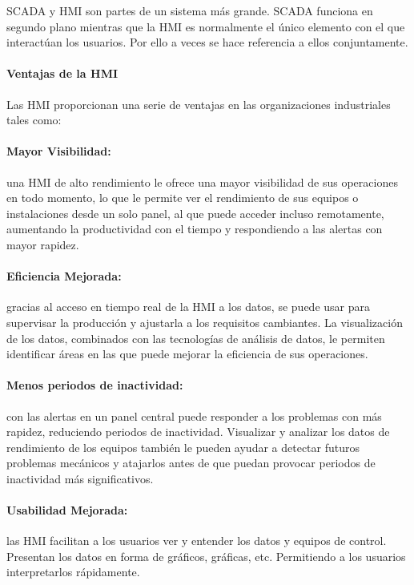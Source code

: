 \documentclass[12pt,titlepage]{article}
\begin{document}
SCADA y HMI son partes de un sistema más grande. SCADA funciona en segundo plano mientras que la HMI es normalmente el único elemento con el que interactúan los usuarios. Por ello a veces se hace referencia a ellos conjuntamente. \\  

\paragraph{Ventajas de la HMI}\leavevmode\newline
Las HMI proporcionan una serie de ventajas en las organizaciones industriales tales como: 

\paragraph*{Mayor Visibilidad:} una HMI de alto rendimiento le ofrece una mayor visibilidad de sus operaciones en todo momento, lo que le permite ver el rendimiento de sus equipos o instalaciones desde un solo panel, al que puede acceder incluso remotamente, aumentando la productividad con el tiempo y respondiendo a las alertas con mayor rapidez.
 
\paragraph*{Eficiencia Mejorada:} gracias al acceso en tiempo real de la HMI a los datos, se puede usar para supervisar la producción y ajustarla a los requisitos cambiantes. La visualización de los datos, combinados con las tecnologías de análisis de datos, le permiten identificar áreas en las que puede mejorar la eficiencia de sus operaciones. 

\paragraph*{Menos periodos de inactividad:} con las alertas en un panel central puede responder a los problemas con más rapidez, reduciendo periodos de inactividad. Visualizar y analizar los datos de rendimiento de los equipos también le pueden ayudar a detectar futuros problemas mecánicos y atajarlos antes de que puedan provocar periodos de inactividad más significativos. 

\paragraph*{Usabilidad Mejorada:} las HMI facilitan a los usuarios ver y entender los datos y equipos de control. Presentan los datos en forma de gráficos, gráficas, etc. Permitiendo a los usuarios interpretarlos rápidamente.
\end{document}
